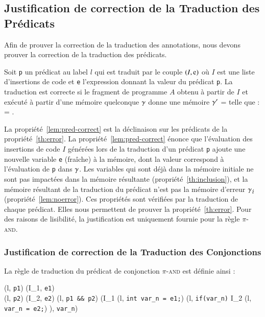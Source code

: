 \subsection{Justification de correction de la Traduction des Prédicats}
\label{sec:predicate-translation}


Afin de prouver la correction de la traduction des annotations,
nous devons prouver la correction de la traduction des prédicats.

\begin{myproperty}
  \label{lem:pred-correct}
  Soit \lstinline'p' un prédicat au label $l$ qui est
  traduit par le couple $(I, \mbox{\lstinline'e'})$ où $I$ est une liste
  d'insertions de code et \lstinline'e' l'expression donnant la valeur du
  prédicat \lstinline'p'.
  La traduction est correcte si le fragment de programme $A$ obtenu à partir de
  $I$ et exécuté à partir d'une mémoire quelconque $\gamma$ donne une
  mémoire $\gamma'$ =  telle que :
   = .
\end{myproperty}

La propriété~\ref{lem:pred-correct} est la déclinaison sur les prédicats de la
propriété~\ref{th:error}.
La propriété~\ref{lem:pred-correct} énonce que l'évaluation des insertions de
code $I$ générées lors de la traduction d'un prédicat \lstinline'p' ajoute une
nouvelle variable \lstinline'e' (fraîche) à la mémoire, dont la
valeur correspond à l'évaluation de \lstinline'p' dans $\gamma$.
Les variables qui sont déjà dans la mémoire initiale ne sont pas
impactées dans la mémoire résultante (propriété~\ref{th:inclusion}), et
la mémoire résultant de la traduction du prédicat n'est pas la mémoire
d'erreur $\gamma_\lightning$ (propriété~\ref{lem:noerror}).
Ces propriétés sont vérifiées par la traduction de chaque prédicat.
Elles nous permettent de prouver la propriété~\ref{th:error}.
Pour des raisons de lisibilité, la justification est uniquement fournie pour la
règle \textsc{$\pi$-and}.%


\subsubsection{Justification de correction de la Traduction des Conjonctions}

La règle de traduction du prédicat de conjonction \textsc{$\pi$-and} est
définie ainsi :

{
  { (l, \mbox{\lstinline'p1'})  (I_1, \mbox{\lstinline'e1'}) \\
    (l, \mbox{\lstinline'p2'})  (I_2, \mbox{\lstinline'e2'}) }
  { (l, \mbox{\lstinline'p1 && p2'}) 
    (I_1 \cdot (l, \mbox{\lstinline'int var_n = e1;'}) \cdot
    (l, \mbox{\lstinline'if(var_n)'} \bopen I_2 \cdot
    (l, \mbox{\lstinline'var_n = e2;'}) \bclose ),
    \mbox{\lstinline'var_n'})
  }{}
}~\\

